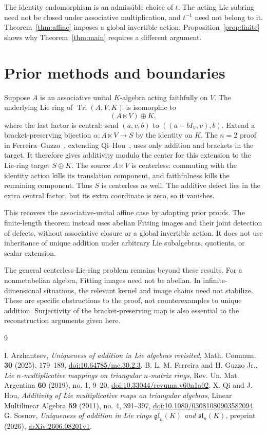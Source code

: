 \documentclass[11pt]{article}
\theoremstyle{definition}
\DeclareMathOperator{\Tri}{Tri}
\begin{document}
The identity endomorphism is an admissible choice of $t$. The acting Lie subring need not be closed under associative multiplication, and $t^{-1}$ need not belong to it. Theorem~\ref{thm:affine} imposes a global invertible action; Proposition~\ref{prop:finite} shows why Theorem~\ref{thm:main} requires a different argument.

\section{Prior methods and boundaries}\label{sec:comparison}
Suppose $A$ is an associative unital $K$-algebra acting faithfully on $V$. The underlying Lie ring of $\Tri(A,V,K)$ is isomorphic to
\[
 (A\ltimes V)\oplus K,
\]
where the last factor is central: send $(a,v,b)$ to $((a-bI_V,v),b)$. Extend a bracket-preserving bijection $\alpha:A\ltimes V\to S$ by the identity on $K$. The $n=2$ proof in Ferreira--Guzzo~\cite[Theorem 4.1]{FG}, extending Qi--Hou~\cite{QH}, uses only addition and brackets in the target. It therefore gives additivity modulo the center for this extension to the Lie-ring target $S\oplus K$. The source $A\ltimes V$ is centerless: commuting with the identity action kills its translation component, and faithfulness kills the remaining component. Thus $S$ is centerless as well. The additive defect lies in the extra central factor, but its extra coordinate is zero, so it vanishes.

This recovers the associative-unital affine case by adapting prior proofs. The finite-length theorem instead uses abelian Fitting images and their joint detection of defects, without associative closure or a global invertible action. It does not use inheritance of unique addition under arbitrary Lie subalgebras, quotients, or scalar extension.

The general centerless-Lie-ring problem remains beyond these results. For a nonmetabelian algebra, Fitting images need not be abelian. In infinite-dimensional situations, the relevant kernel and image chains need not stabilize. These are specific obstructions to the proof, not counterexamples to unique addition. Surjectivity of the bracket-preserving map is also essential to the reconstruction arguments given here.

\begin{thebibliography}{9}
\raggedright
{} I. Arzhantsev, \emph{Uniqueness of addition in Lie algebras revisited}, Math. Commun. \textbf{30} (2025), 179--189, \href{https://doi.org/10.64785/mc.30.2.3}{doi:10.64785/mc.30.2.3}.
 B. L. M. Ferreira and H. Guzzo Jr., \emph{Lie $n$-multiplicative mappings on triangular $n$-matrix rings}, Rev. Un. Mat. Argentina \textbf{60} (2019), no. 1, 9--20, \href{https://doi.org/10.33044/revuma.v60n1a02}{doi:10.33044/revuma.v60n1a02}.
 X. Qi and J. Hou, \emph{Additivity of Lie multiplicative maps on triangular algebras}, Linear Multilinear Algebra \textbf{59} (2011), no. 4, 391--397, \href{https://doi.org/10.1080/03081080903582094}{doi:10.1080/03081080903582094}.
 G. Sosnov, \emph{Uniqueness of addition in Lie rings $\mathfrak{gl}_n(K)$ and $\mathfrak{sl}_n(K)$}, preprint (2026), \href{https://arxiv.org/abs/2606.08201}{arXiv:2606.08201v1}.
\end{thebibliography}
\end{document}
